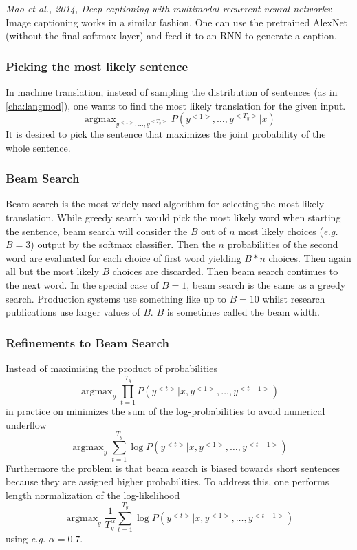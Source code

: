 \documentclass{article}
\begin{document}
\emph{Mao et al., 2014, Deep captioning with multimodal recurrent neural networks}:
Image captioning works in a similar fashion.
One can use the pretrained AlexNet (without the final softmax layer) and feed it to an RNN to generate a caption.

\subsubsection{Picking the most likely sentence}
In machine translation, instead of sampling the distribution of sentences (as in \cref{cha:langmod}),
one wants to find the most likely translation for the given input.
\begin{equation}
  \mathop{\operatorname{argmax}}_{y^{<1>},\ldots,y^{<T_y>}}P(y^{<1>},\ldots,y^{<T_y>}|x)
\end{equation}
It is desired to pick the sentence that maximizes the joint probability of the whole sentence.

\subsubsection{Beam Search}
Beam search is the most widely used algorithm for selecting the most likely translation.
While greedy search would pick the most likely word when starting the sentence,
beam search will consider the $B$ out of $n$ most likely choices (\emph{e.g.} $B=3$) output by the softmax classifier.
Then the $n$ probabilities of the second word are evaluated for each choice of first word yielding $B*n$ choices.
Then again all but the most likely $B$ choices are discarded.
Then beam search continues to the next word.
In the special case of $B=1$, beam search is the same as a greedy search.
Production systems use something like up to $B=10$ whilst research publications use larger values of $B$.
$B$ is sometimes called the beam width.

\subsubsection{Refinements to Beam Search}
Instead of maximising the product of probabilities
\begin{equation}
  \mathop{\operatorname{argmax}}_y \prod_{t=1}^{T_y} P(y^{<t>}|x,y^{<1>},\ldots,y^{<t-1>})
\end{equation}
in practice on minimizes the sum of the log-probabilities to avoid numerical underflow
\begin{equation}
  \mathop{\operatorname{argmax}}_y \sum_{t=1}^{T_y} \log P(y^{<t>}|x,y^{<1>},\ldots,y^{<t-1>})
\end{equation}
Furthermore the problem is that beam search is biased towards short sentences because they are assigned higher probabilities.
To address this, one performs length normalization of the log-likelihood
\begin{equation}
  \mathop{\operatorname{argmax}}_y \frac{1}{T_y^\alpha}\sum_{t=1}^{T_y} \log P(y^{<t>}|x,y^{<1>},\ldots,y^{<t-1>})
\end{equation}
using \emph{e.g.} $\alpha=0.7$.
\end{document}
